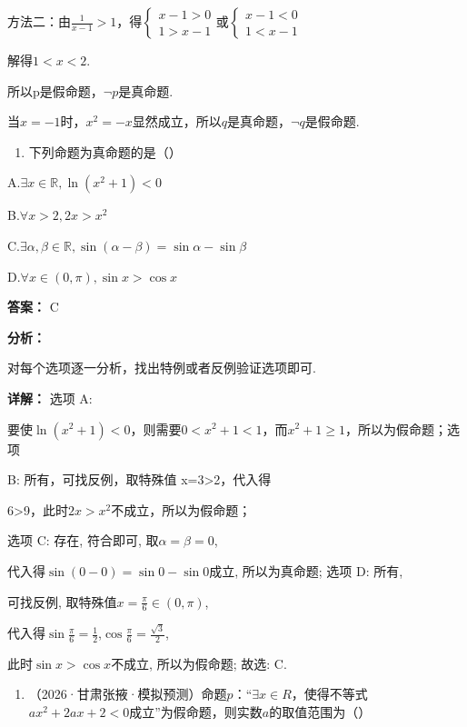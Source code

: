 \documentclass[11pt,a4paper]{ctexart}
\begin{document}
方法二：由\(\frac{1}{x - 1} > 1\)，得\(\left\{ \begin{array}{l} x - 1 > 0 \\ 1 > x - 1 \end{array} \right.\)或\(\left\{ \begin{array}{l} x - 1 < 0 \\ 1 < x - 1 \end{array} \right.\)

解得\(1 < x < 2\).

所以p是假命题，\(\neg p\)是真命题.

当\(x = -1\)时，\(x^{2} = -x\)显然成立，所以\(q\)是真命题，\(\neg q\)是假命题.

\begin{enumerate}[label=\arabic*., leftmargin=*, start=2]
\item 下列命题为真命题的是（）
\end{enumerate}

A.\(\exists x \in \mathbb{R}, \ln (x^2 + 1) < 0\)

B.\(\forall x > 2, 2x > x^{2}\)

C.\(\exists \alpha, \beta \in \mathbb{R}, \sin (\alpha - \beta) = \sin \alpha - \sin \beta\)

D.\(\forall x\in (0,\pi),\sin x > \cos x\)

\textbf{答案：}
C

\textbf{分析：}

对每个选项逐一分析，找出特例或者反例验证选项即可.

\textbf{详解：}
选项 A:

要使\(\ln(x^{2}+1)<0\)，则需要\(0<x^{2}+1<1\)，而\(x^{2}+1\geq1\)，所以为假命题；选项

B: 所有，可找反例，取特殊值 x=3\textgreater2，代入得

6\textgreater9，此时\(2x>x^{2}\)不成立，所以为假命题；

选项 C: 存在, 符合即可, 取\(\alpha = \beta = 0\),

代入得\(\sin(0 - 0) = \sin 0 - \sin 0\)成立, 所以为真命题; 选项 D: 所有,

可找反例, 取特殊值\(x = \frac{\pi}{6} \in (0, \pi)\),

代入得\(\sin\frac{\pi}{6} = \frac{1}{2}\),\(\cos\frac{\pi}{6} = \frac{\sqrt{3}}{2}\),

此时\(\sin x > \cos x\)不成立, 所以为假命题; 故选: C.

\begin{enumerate}[label=\arabic*., leftmargin=*, start=3]
\item （2026·甘肃张掖·模拟预测）命题\(p\)：``\(\exists x \in R\)，使得不等式\(ax^2 + 2ax + 2 < 0\)成立''为假命题，则实数\(a\)的取值范围为（）
\end{enumerate}
\end{document}
